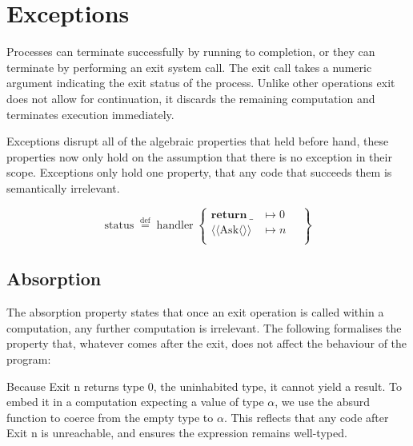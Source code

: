 \documentclass[logo,bsc,singlespacing,parskip]{infthesis}
\begin{document}
\section{Exceptions}
Processes can terminate successfully by running to completion, or they can terminate by performing an exit system call. The exit call takes a numeric argument indicating the exit status of the process. Unlike other operations exit does not allow for continuation, it discards the remaining computation and terminates execution immediately.

Exceptions disrupt all of the algebraic properties that held before hand, these properties now only hold on the assumption that there is no exception in their scope. Exceptions only hold one property, that any code that succeeds them is semantically irrelevant.



\[
\mathrm{status} \;\overset{\mathrm{def}}{=}\;
\mathrm{handler} \;\left\{
\begin{array}{ll}
  \mathrm{\textbf{return}\:\_} & \mapsto 0 \quad\\[0.5ex]
  \langle\!\langle \mathrm{Ask} \langle\rangle\rangle &  \mapsto n \quad\\[0.5ex]
 
\end{array}
\right\}
\]







\subsection*{Absorption}

The absorption property states that once an exit operation is called within a computation, any further computation is irrelevant. The following formalises the property that, whatever comes after the exit, does not affect the behaviour of the program:


Because Exit n returns type 0, the uninhabited type, it cannot yield a result. To embed it in a computation expecting a value of type $\alpha$, we use the absurd function to coerce from the empty type to $\alpha$. This reflects that any code after Exit n is unreachable, and ensures the expression remains well-typed.
\end{document}
